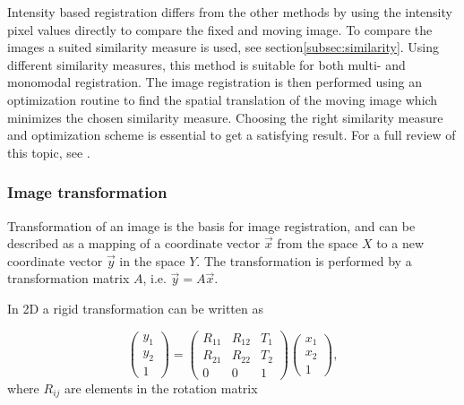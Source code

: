 Intensity based registration differs from the other methods by using the intensity pixel values directly to compare the fixed and moving image. To compare the images a suited similarity measure is used, see section\ref{subsec:similarity}. Using different similarity measures, this method is suitable for both multi- and monomodal registration. The image registration is then performed using an optimization routine to find the spatial translation of the moving image which minimizes the chosen similarity measure. Choosing the right similarity measure and optimization scheme is essential to get a satisfying result. For a full review of this topic, see \cite{Maintz1998}.

%

\subsubsection{Image transformation}

Transformation of an image is the basis for image registration, and can be described as a mapping of a coordinate vector $\vec{x}$ from the space $X$ to a new coordinate vector $\vec{y}$ in the space $Y$. The transformation is performed by a transformation matrix $A$, i.e. $\vec{y} = A\vec{x}$.

In 2D a rigid transformation can be written as 

\begin{equation}
	\label{rigid}
	\begin{pmatrix}
		y_1 \\
		y_2 \\
		1 
	\end{pmatrix}
	=
	\begin{pmatrix}
		R_{11} & R_{12} & T_1\\
		R_{21} & R_{22} & T_2\\		
		0 & 0 & 1
	\end{pmatrix}
	\begin{pmatrix}
		x_1\\
		x_2\\
		1
	\end{pmatrix},
\end{equation}
where $R_{ij}$ are elements in the rotation matrix 

